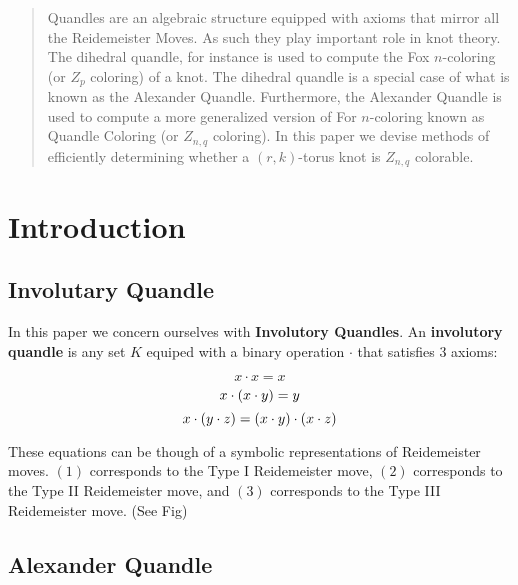 \documentclass[12pt]{article}
\begin{document}
\maketitle

\begin{abstract}
	Quandles are an algebraic structure equipped with axioms that mirror all the Reidemeister Moves. As such they play important role in knot theory. The dihedral quandle, for instance is used to compute the Fox $n$-coloring (or $Z_p$ coloring) of a knot. The dihedral quandle is a special case of what is known as the Alexander Quandle. Furthermore, the Alexander Quandle is used to compute a more generalized version of For $n$-coloring known as Quandle Coloring (or $Z_{n,q}$ coloring). In this paper we devise methods of efficiently determining whether a $(r,k)$-torus knot is $Z_{n,q}$ colorable.
\end{abstract}

\section{Introduction}
\subsection{Involutary Quandle}
In this paper we concern ourselves with \textbf{Involutory Quandles}. An \textbf{involutory quandle} is any set $K$ equiped with a binary operation $\cdot$ that satisfies $3$ axioms:

\begin{equation}
	x \cdot x = x
\end{equation}
\begin{equation}
	x \cdot (x \cdot y) = y \\
\end{equation}
\begin{equation}
	x \cdot (y \cdot z) = (x \cdot y) \cdot (x \cdot z) \\
\end{equation}

These equations can be though of a symbolic representations of Reidemeister moves. $(1)$ corresponds to the Type I Reidemeister move, $(2)$ corresponds to the Type II Reidemeister move, and $(3)$ corresponds to the Type III Reidemeister move. (See Fig)

\subsection{Alexander Quandle}
\end{document}
